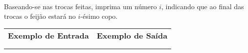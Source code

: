 Baseando-se nas trocas feitas, imprima um número $i$, indicando que ao final das trocas o feijão estará no $i$-ésimo copo. \\

\begin{flushleft}
\begin{tabularx}{1.01\textwidth}{ | p{6cm} | p{10cm} | }
\hline
\textbf{Exemplo de Entrada} & \textbf{Exemplo de Saída} \\

&

\\
\hline

&

\\
\hline
\end{tabularx}
\end{flushleft}
